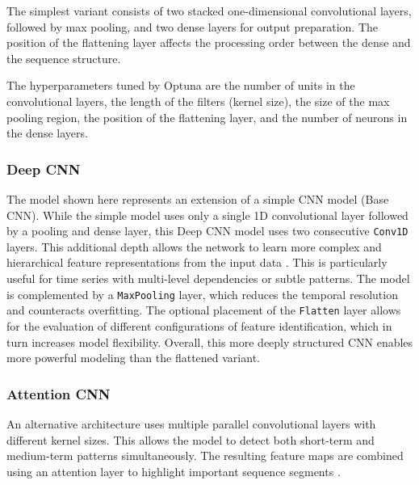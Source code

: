 The simplest variant consists of two stacked one-dimensional convolutional layers, followed by max pooling, and two dense layers for output preparation.
The position of the flattening layer affects the processing order between the dense and the sequence structure.

The hyperparameters tuned by Optuna are the number of units in the convolutional layers, the length of the filters (kernel size), the size of the max pooling region, the position of the flattening layer, and the number of neurons in the dense layers.



\subsubsection{Deep CNN}

The model shown here represents an extension of a simple CNN model (Base CNN).
While the simple model uses only a single 1D convolutional layer followed by a pooling and dense layer, this Deep CNN model uses two consecutive \texttt{Conv1D} layers.
This additional depth allows the network to learn more complex and hierarchical feature representations from the input data \cite{cnn-deep-more-complex}.
This is particularly useful for time series with multi-level dependencies or subtle patterns.
The model is complemented by a \texttt{MaxPooling} layer, which reduces the temporal resolution and counteracts overfitting.
The optional placement of the \texttt{Flatten} layer allows for the evaluation of different configurations of feature identification, which in turn increases model flexibility.
Overall, this more deeply structured CNN enables more powerful modeling than the flattened variant.



\subsubsection{Attention CNN}

An alternative architecture uses multiple parallel convolutional layers with different kernel sizes.
This allows the model to detect both short-term and medium-term patterns simultaneously.
The resulting feature maps are combined using an attention layer to highlight important sequence segments \cite{cnn-attention}.

